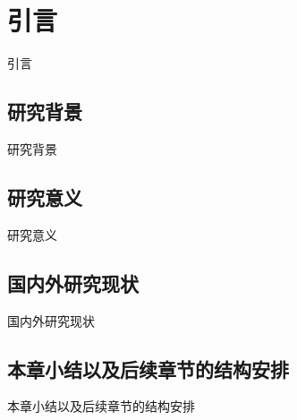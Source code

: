 
\mainmatter


\chapter{引言}

引言

\section{研究背景}
研究背景


\section{研究意义}
研究意义



\section{国内外研究现状}
国内外研究现状


\section{本章小结以及后续章节的结构安排}
本章小结以及后续章节的结构安排
